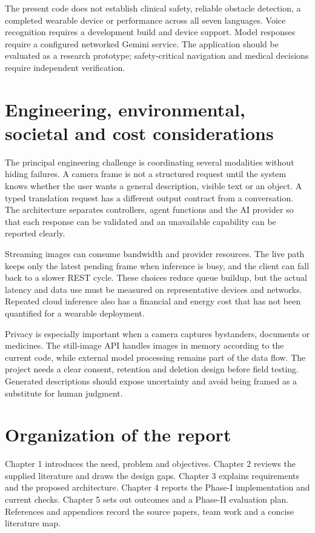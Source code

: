 \documentclass[12pt,a4paper,oneside]{report}
\begin{document}
The present code does not establish clinical safety, reliable obstacle detection, a completed wearable device or performance across all seven languages. Voice recognition requires a development build and device support. Model responses require a configured networked Gemini service. The application should be evaluated as a research prototype; safety-critical navigation and medical decisions require independent verification.

\section{Engineering, environmental, societal and cost considerations}
The principal engineering challenge is coordinating several modalities without hiding failures. A camera frame is not a structured request until the system knows whether the user wants a general description, visible text or an object. A typed translation request has a different output contract from a conversation. The architecture separates controllers, agent functions and the AI provider so that each response can be validated and an unavailable capability can be reported clearly.

Streaming images can consume bandwidth and provider resources. The live path keeps only the latest pending frame when inference is busy, and the client can fall back to a slower REST cycle. These choices reduce queue buildup, but the actual latency and data use must be measured on representative devices and networks. Repeated cloud inference also has a financial and energy cost that has not been quantified for a wearable deployment.

Privacy is especially important when a camera captures bystanders, documents or medicines. The still-image API handles images in memory according to the current code, while external model processing remains part of the data flow. The project needs a clear consent, retention and deletion design before field testing. Generated descriptions should expose uncertainty and avoid being framed as a substitute for human judgment.

\section{Organization of the report}
Chapter 1 introduces the need, problem and objectives. Chapter 2 reviews the supplied literature and draws the design gaps. Chapter 3 explains requirements and the proposed architecture. Chapter 4 reports the Phase-I implementation and current checks. Chapter 5 sets out outcomes and a Phase-II evaluation plan. References and appendices record the source papers, team work and a concise literature map.
\end{document}
